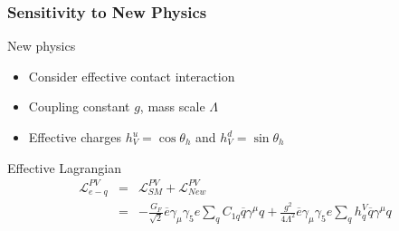 \begin{frame}
 \frametitle{Sensitivity to New Physics}
 \abovedisplayskip=0pt
 \abovedisplayshortskip=0pt
 \begin{block}{New physics}
  \begin{itemize}
   \item Consider effective contact interaction
   \item Coupling constant $g$, mass scale $\Lambda$
   \item Effective charges $h^u_V = \cos \theta_h$ and $h^d_V = \sin \theta_h$
  \end{itemize}
 \end{block}
 \begin{block}{Effective Lagrangian}
  \begin{eqnarray*}
   \mathcal{L}^{PV}_{e-q} & = & \mathcal{L}^{PV}_{SM} + \mathcal{L}^{PV}_{New} \\
    & = & -\frac{G_F}{\sqrt{2}} \overline{e} \gamma_\mu \gamma_5 e \sum_q C_{1q} \overline{q} \gamma^\mu q + \frac{g^2}{4 \Lambda^2} \overline{e} \gamma_\mu \gamma_5 e \sum_q h^V_q \overline{q} \gamma^\mu q
  \end{eqnarray*}
 \end{block}
 \begin{center}
 \end{center}
\end{frame}
